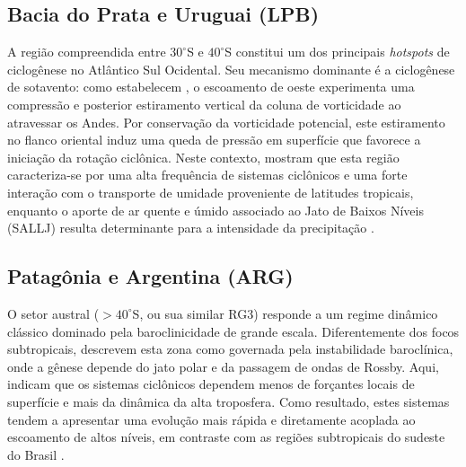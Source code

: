\subsection{Bacia do Prata e Uruguai (LPB)}\label{subsec:mt_lpb}
A região compreendida entre $30^\circ$S e $40^\circ$S constitui um dos principais \textit{hotspots} de ciclogênese no Atlântico Sul Ocidental. Seu mecanismo dominante é a ciclogênese de sotavento: como estabelecem \citet{gan1994influence}, o escoamento de oeste experimenta uma compressão e posterior estiramento vertical da coluna de vorticidade ao atravessar os Andes. Por conservação da vorticidade potencial, este estiramento no flanco oriental induz uma queda de pressão em superfície que favorece a iniciação da rotação ciclônica. Neste contexto, \citet{reboita2010south} mostram que esta região caracteriza-se por uma alta frequência de sistemas ciclônicos e uma forte interação com o transporte de umidade proveniente de latitudes tropicais, enquanto o aporte de ar quente e úmido associado ao Jato de Baixos Níveis (SALLJ) resulta determinante para a intensidade da precipitação \citep{crespo2020potential}.
\subsection{Patagônia e Argentina (ARG)}\label{subsec:mt_arg}
O setor austral ($>40^\circ$S, ou sua similar RG3) responde a um regime dinâmico clássico dominado pela baroclinicidade de grande escala. Diferentemente dos focos subtropicais, \citet{hoskins2005new} descrevem esta zona como governada pela instabilidade baroclínica, onde a gênese depende do jato polar e da passagem de ondas de Rossby. Aqui, \citet{simmonds2000variability} indicam que os sistemas ciclônicos dependem menos de forçantes locais de superfície e mais da dinâmica da alta troposfera. Como resultado, estes sistemas tendem a apresentar uma evolução mais rápida e diretamente acoplada ao escoamento de altos níveis, em contraste com as regiões subtropicais do sudeste do Brasil \citep{vera2002cold}.

